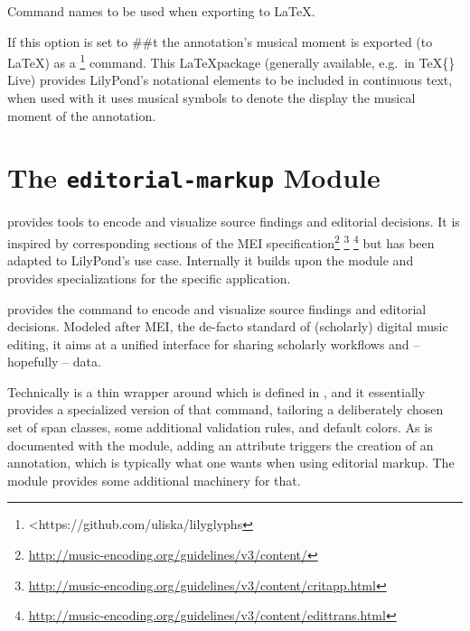 \documentclass[]{ollmanual}
\begin{document}

Command names to be used when exporting to \LaTeX.


If this option is set to \#\#t the annotation's musical moment is
exported (to \LaTeX) as a \footnote{\textless{}https://github.com/uliska/lilyglyphs}
command. This \LaTeX package (generally available, e.g.~in \TeX\{\}
Live) provides LilyPond's notational elements to be included in
continuous text, when used with  it uses
musical symbols to denote the display the musical moment of the
annotation.

\hypertarget{the-editorial-markup-module}{%
\section{\texorpdfstring{The \texttt{editorial-markup}
Module}{The editorial-markup Module}}\label{the-editorial-markup-module}}

 provides tools to encode and
visualize source findings and editorial decisions. It is inspired by
corresponding sections of the MEI specification\footnote{\url{http://music-encoding.org/guidelines/v3/content/}}
\footnote{\url{http://music-encoding.org/guidelines/v3/content/critapp.html}}
\footnote{\url{http://music-encoding.org/guidelines/v3/content/edittrans.html}}
but has been adapted to LilyPond's use case. Internally it builds upon
the  module and provides specializations
for the specific application.

 provides the
 command to encode and visualize source findings
and editorial decisions. Modeled after MEI, the de-facto standard of
(scholarly) digital music editing, it aims at a unified interface for
sharing scholarly workflows and -- hopefully -- data.

Technically  is a thin wrapper around 
which is defined in , and it essentially
provides a specialized version of that command, tailoring a deliberately
chosen set of span classes, some additional validation rules, and
default colors. As is documented with the  module,
adding an  attribute triggers the creation of an
annotation, which is typically what one wants when using editorial
markup. The  module provides some
additional machinery for that.
\end{document}
